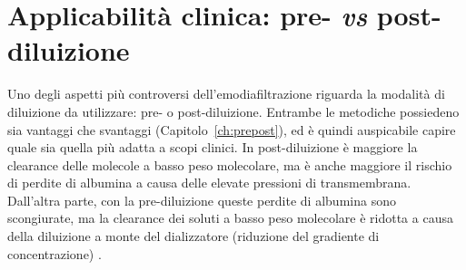 \section{Applicabilità clinica: pre- \textit{vs} post-diluizione}
Uno degli aspetti più controversi dell'emodiafiltrazione riguarda la modalità di diluizione da utilizzare: pre- o post-diluizione. Entrambe le metodiche possiedeno sia vantaggi che svantaggi (Capitolo~\ref{ch:prepost}), ed è quindi auspicabile capire quale sia quella più adatta a scopi clinici. In post-diluizione è maggiore la clearance delle molecole a basso peso molecolare, ma è anche maggiore il rischio di perdite di albumina a causa delle elevate pressioni di transmembrana. Dall'altra parte, con la pre-diluizione queste perdite di albumina sono scongiurate, ma la clearance dei soluti a basso peso molecolare è ridotta a causa della diluizione a monte del dializzatore (riduzione del gradiente di concentrazione) \cite{masakane, colussi}.

